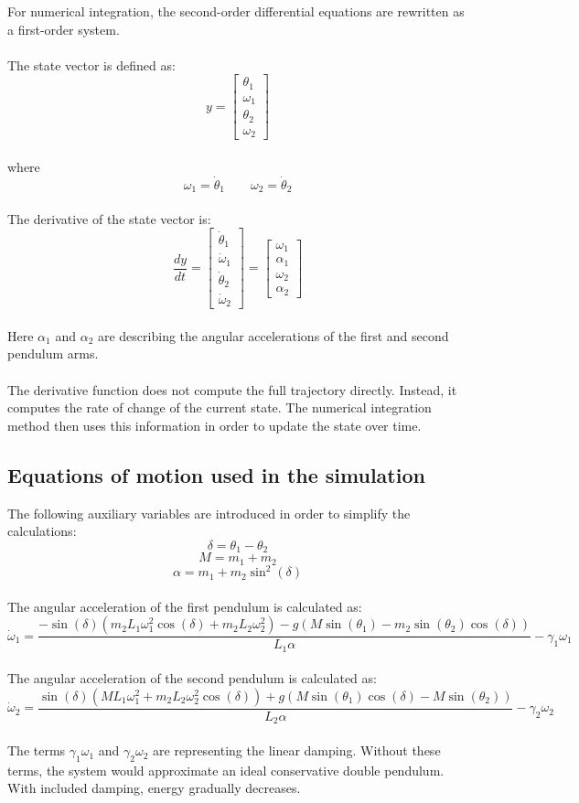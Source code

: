 \documentclass[12pt,a4paper]{article}
\begin{document}
For numerical integration, the second-order differential equations are rewritten as a first-order system.
\\\\
The state vector is defined as:
\[y =\begin{bmatrix}\theta_1 \\\omega_1 \\\theta_2 \\\omega_2\end{bmatrix}\]\\
where
\[\omega_1 = \dot{\theta}_1\qquad\omega_2 = \dot{\theta}_2\]\\
The derivative of the state vector is:
\[\frac{dy}{dt}=\begin{bmatrix}\dot{\theta}_1 \\\dot{\omega}_1 \\\dot{\theta}_2 \\\dot{\omega}_2\end{bmatrix}=\begin{bmatrix}\omega_1 \\\alpha_1 \\\omega_2 \\\alpha_2\end{bmatrix}\]\\
Here $\alpha_1$ and $\alpha_2$ are describing the angular accelerations of the first and second pendulum arms.
\\\\
The derivative function does not compute the full trajectory directly. Instead, it computes the rate of change of the current state. The numerical integration method then uses this information in order to update the state over time.

\subsection{Equations of motion used in the simulation}

The following auxiliary variables are introduced in order to simplify the calculations:
\[\delta = \theta_1 - \theta_2\]
\[M = m_1 + m_2\]
\[\alpha = m_1 + m_2 \sin^2(\delta)\]\\
The angular acceleration of the first pendulum is calculated as:
\[\dot{\omega}_1 =
\frac{
-\sin(\delta)
\left(
m_2 L_1 \omega_1^2 \cos(\delta)+m_2 L_2 \omega_2^2\right)-g\left(M\sin(\theta_1)-m_2\sin(\theta_2)\cos(\delta)\right)}{L_1\alpha}-\gamma_1\omega_1\]\\
The angular acceleration of the second pendulum is calculated as:
\[\dot{\omega}_2 =\frac{\sin(\delta)\left(ML_1\omega_1^2+m_2L_2\omega_2^2\cos(\delta)\right)+g\left(M\sin(\theta_1)\cos(\delta)-M\sin(\theta_2)\right)}{L_2\alpha}-\gamma_2\omega_2\]\\
The terms $\gamma_1\omega_1$ and $\gamma_2\omega_2$ are representing the linear damping. Without these terms, the system would approximate an ideal conservative double pendulum. With included damping, energy gradually decreases.
\end{document}
